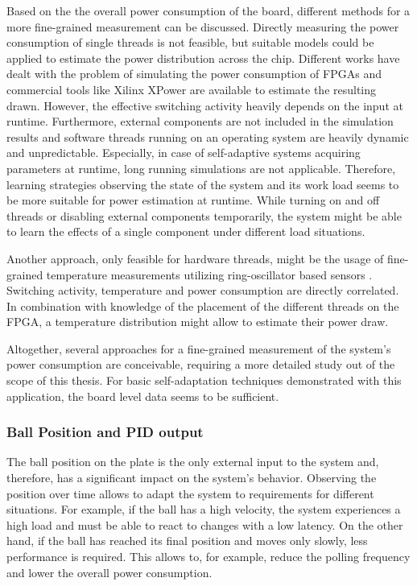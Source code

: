 Based on the the overall power consumption of the board, different methods for
a more fine-grained measurement can be discussed. Directly measuring the power
consumption of single threads is not feasible, but suitable models could be
applied to estimate the power distribution across the chip. Different works
have dealt with the problem of simulating the power consumption of \acp{FPGA}
\citep{DeTu05,JeCa11} and commercial tools like Xilinx XPower are available to
estimate the resulting drawn. However, the effective switching activity
heavily depends on the input at runtime. Furthermore, external components are
not included in the simulation results and software threads running on an
operating system are heavily dynamic and unpredictable. Especially, in case of
self-adaptive systems acquiring parameters at runtime, long running
simulations are not applicable. Therefore, learning strategies observing the
state of the system and its work load seems to be more suitable for power
estimation at runtime. While turning on and off threads or disabling external
components temporarily, the system might be able to learn the effects of a
single component under different load situations.

Another approach, only feasible for hardware threads, might be the usage of
fine-grained temperature measurements utilizing ring-oscillator based sensors
\citep{RAH12,JJR13}. Switching activity, temperature and power consumption are
directly correlated. In combination with knowledge of the placement of the
different threads on the \ac{FPGA}, a temperature distribution might allow to
estimate their power draw.

Altogether, several approaches for a fine-grained measurement of the system's
power consumption are conceivable, requiring a more detailed study out of the
scope of this thesis. For basic self-adaptation techniques demonstrated with
this application, the board level data seems to be sufficient.

\subsubsection{Ball Position and \acs{PID} output}
The ball position on the plate is the only external input to the system and,
therefore, has a significant impact on the system's behavior. Observing the
position over time allows to adapt the system to requirements for different
situations. For example, if the ball has a high velocity, the system
experiences a high load and must be able to react to changes with a low
latency. On the other hand, if the ball has reached its final position and
moves only slowly, less performance is required. This allows to, for example,
reduce the polling frequency and lower the overall power consumption.

